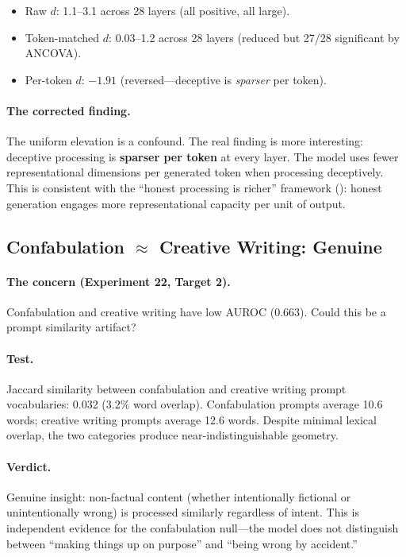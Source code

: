 \begin{itemize}[leftmargin=*]
    \item Raw $d$: 1.1--3.1 across 28 layers (all positive, all large).
    \item Token-matched $d$: 0.03--1.2 across 28 layers (reduced but 27/28 significant by ANCOVA).
    \item Per-token $d$: $-1.91$ (reversed---deceptive is \emph{sparser} per token).
\end{itemize}

\paragraph{The corrected finding.} The uniform elevation is a confound. The real finding is more interesting: deceptive processing is \textbf{sparser per token} at every layer. The model uses fewer representational dimensions per generated token when processing deceptively. This is consistent with the ``honest processing is richer'' framework (): honest generation engages more representational capacity per unit of output.

\subsection{Confabulation $\approx$ Creative Writing: Genuine}
\label{sec:confab_creative}

\paragraph{The concern (Experiment 22, Target 2).} Confabulation and creative writing have low AUROC (0.663). Could this be a prompt similarity artifact?

\paragraph{Test.} Jaccard similarity between confabulation and creative writing prompt vocabularies: 0.032 (3.2\% word overlap). Confabulation prompts average 10.6 words; creative writing prompts average 12.6 words. Despite minimal lexical overlap, the two categories produce near-indistinguishable geometry.

\paragraph{Verdict.} Genuine insight: non-factual content (whether intentionally fictional or unintentionally wrong) is processed similarly regardless of intent. This is independent evidence for the confabulation null---the model does not distinguish between ``making things up on purpose'' and ``being wrong by accident.''
